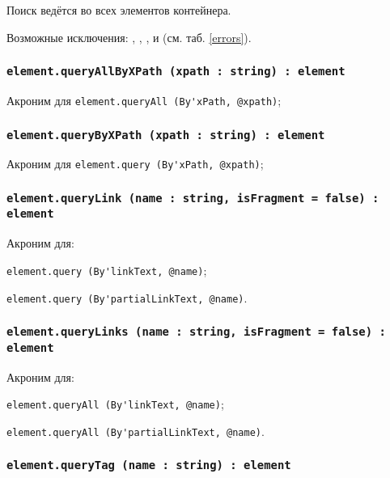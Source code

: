 \code{[icL]} Поиск ведётся во всех элементов контейнера.

Возможные исключения: , , ,  и  (см. таб. \ref{errors}).

\subsubsection{\lstinline|element.queryAllByXPath (xpath : string) : element|}

Акроним для \lstinline|element.queryAll (By'xPath, @xpath)|;

\subsubsection{\lstinline|element.queryByXPath (xpath : string) : element|}

Акроним для \lstinline|element.query (By'xPath, @xpath)|;

\subsubsection{\lstinline|element.queryLink (name : string, isFragment = false) : element|}

Акроним для:
\begin{icItems}
	\item \lstinline|element.query (By'linkText, @name)|;
	\item \lstinline|element.query (By'partialLinkText, @name)|.
\end{icItems}

\subsubsection{\lstinline|element.queryLinks (name : string, isFragment = false) : element|}

Акроним для:
\begin{icItems}
	\item \lstinline|element.queryAll (By'linkText, @name)|;
	\item \lstinline|element.queryAll (By'partialLinkText, @name)|.
\end{icItems}

\subsubsection{\lstinline|element.queryTag (name : string) : element|}

